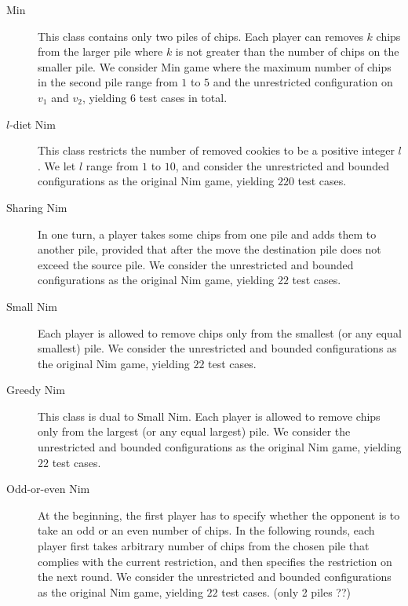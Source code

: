 \documentclass[review]{elsarticle}
\begin{document}
\begin{description}
	\item[Min]
	This class contains only two piles of chips.
	Each player can removes $k$ chips from the larger pile where $k$ is not greater than the number of chips on the smaller pile.
	We consider Min game where the maximum number of chips in the second pile range from $1$ to $5$ and the unrestricted configuration on $v_1$ and $v_2$, yielding $6$ test cases in total.
	
	\item[$l$-diet Nim]
	This class restricts the number of removed cookies to be a positive integer $l$.
	We let $l$ range from $1$ to $10$, and consider the unrestricted and bounded configurations as the original Nim game, yielding $220$ test cases.
	
	\item[Sharing Nim]
	In one turn, a player takes some chips from one pile and adds them to another pile, provided that after the move the destination pile does not exceed the source pile.
	We consider the unrestricted and bounded configurations as the original	Nim game, yielding $22$ test cases.
	
	\item[Small Nim]
	Each player is allowed to remove chips only from the smallest (or any equal smallest) pile. %
	We consider the unrestricted and bounded configurations as the original	Nim game, yielding $22$ test cases.
	
	\item[Greedy Nim]
	This class is dual to Small Nim.
	Each player is allowed to remove chips only from the largest (or any equal largest) pile. %
	We consider the unrestricted and bounded configurations as the original	Nim game, yielding $22$ test cases.
	
	\item[Odd-or-even Nim] 
	At the beginning, the first player has to specify whether the opponent is to take an odd or an even number of chips. 
	In the following rounds, each player first takes arbitrary number of chips from the chosen pile that complies with the current restriction, and then specifies the restriction on the next round.
	We consider the unrestricted and bounded configurations as the original	Nim game, yielding $22$ test cases. (only 2 piles ??)
%	
	

\end{description}
\end{document}
